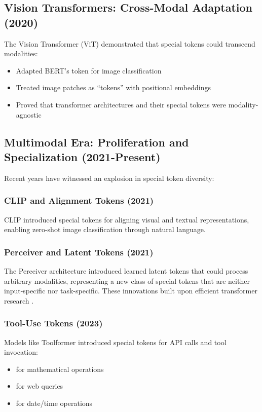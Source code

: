 \subsection{Vision Transformers: Cross-Modal Adaptation (2020)}

The Vision Transformer (ViT) \citep{dosovitskiy2020image} demonstrated that special tokens could transcend modalities:

\begin{itemize}
\item Adapted BERT's \cls{} token for image classification
\item Treated image patches as ``tokens'' with positional embeddings
\item Proved that transformer architectures and their special tokens were modality-agnostic
\end{itemize}

\subsection{Multimodal Era: Proliferation and Specialization (2021-Present)}

Recent years have witnessed an explosion in special token diversity:

\subsubsection{CLIP and Alignment Tokens (2021)}
CLIP \citep{radford2021learning} introduced special tokens for aligning visual and textual representations, enabling zero-shot image classification through natural language.

\subsubsection{Perceiver and Latent Tokens (2021)}
The Perceiver architecture introduced learned latent tokens that could process arbitrary modalities, representing a new class of special tokens that are neither input-specific nor task-specific. These innovations built upon efficient transformer research \citep{tay2022efficient}.

\subsubsection{Tool-Use Tokens (2023)}
Models like Toolformer \citep{schick2023toolformer} introduced special tokens for API calls and tool invocation:
\begin{itemize}
\item {} for mathematical operations
\item {} for web queries
\item {} for date/time operations
\end{itemize}

